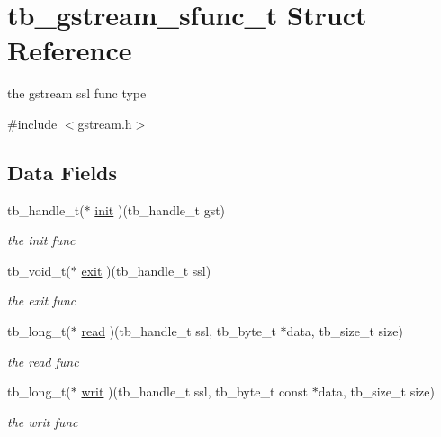 \hypertarget{structtb__gstream__sfunc__t}{\section{tb\-\_\-gstream\-\_\-sfunc\-\_\-t Struct Reference}
\label{d1/db5/structtb__gstream__sfunc__t}
}


the gstream ssl func type  




{\ttfamily \#include $<$gstream.\-h$>$}

\subsection*{Data Fields}
\begin{DoxyCompactItemize}
\item 
\hypertarget{structtb__gstream__sfunc__t_adeeff911a005078868c3f3f8cc5c7c0c}{tb\-\_\-handle\-\_\-t($\ast$ \hyperlink{structtb__gstream__sfunc__t_adeeff911a005078868c3f3f8cc5c7c0c}{init} )(tb\-\_\-handle\-\_\-t gst)}\label{d1/db5/structtb__gstream__sfunc__t_adeeff911a005078868c3f3f8cc5c7c0c}

\begin{DoxyCompactList}\small\item\em the init func \end{DoxyCompactList}\item 
\hypertarget{structtb__gstream__sfunc__t_ab77a687a6bf8037a5b824c0920e487ec}{tb\-\_\-void\-\_\-t($\ast$ \hyperlink{structtb__gstream__sfunc__t_ab77a687a6bf8037a5b824c0920e487ec}{exit} )(tb\-\_\-handle\-\_\-t ssl)}\label{d1/db5/structtb__gstream__sfunc__t_ab77a687a6bf8037a5b824c0920e487ec}

\begin{DoxyCompactList}\small\item\em the exit func \end{DoxyCompactList}\item 
\hypertarget{structtb__gstream__sfunc__t_ab8dc0a282c26adf1c5ce60d74ebdcf57}{tb\-\_\-long\-\_\-t($\ast$ \hyperlink{structtb__gstream__sfunc__t_ab8dc0a282c26adf1c5ce60d74ebdcf57}{read} )(tb\-\_\-handle\-\_\-t ssl, tb\-\_\-byte\-\_\-t $\ast$data, tb\-\_\-size\-\_\-t size)}\label{d1/db5/structtb__gstream__sfunc__t_ab8dc0a282c26adf1c5ce60d74ebdcf57}

\begin{DoxyCompactList}\small\item\em the read func \end{DoxyCompactList}\item 
\hypertarget{structtb__gstream__sfunc__t_ad087b91f2a1925fb58ba5fe2b18e4277}{tb\-\_\-long\-\_\-t($\ast$ \hyperlink{structtb__gstream__sfunc__t_ad087b91f2a1925fb58ba5fe2b18e4277}{writ} )(tb\-\_\-handle\-\_\-t ssl, tb\-\_\-byte\-\_\-t const $\ast$data, tb\-\_\-size\-\_\-t size)}\label{d1/db5/structtb__gstream__sfunc__t_ad087b91f2a1925fb58ba5fe2b18e4277}

\begin{DoxyCompactList}\small\item\em the writ func \end{DoxyCompactList}\end{DoxyCompactItemize}


